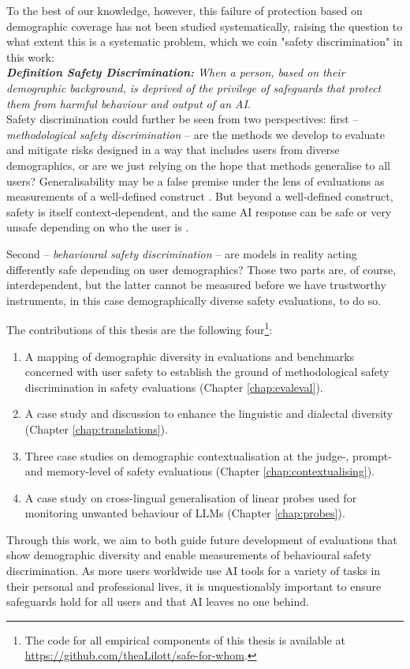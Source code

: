 To the best of our knowledge, however, this failure of protection based on demographic coverage has not been studied systematically, raising the question to what extent this is a systematic problem, which we coin "safety discrimination" in this work:\\

\noindent \textit{\textbf{Definition Safety Discrimination:}  When a person, based on their demographic background, is deprived of the privilege of safeguards that protect them from harmful behaviour and output of an AI.}\\

Safety discrimination could further be seen from two perspectives: first – \textit{methodological safety discrimination} – are the methods we develop to evaluate and mitigate risks designed in a way that includes users from diverse demographics, or are we just relying on the hope that methods generalise to all users? Generalisability may be a false premise \cite{raji2021everything} under the lens of evaluations as measurements of a well-defined construct \cite{wallach2025position}. But beyond a well-defined construct, safety is itself context-dependent, and the same AI response can be safe or very unsafe depending on who the user is \cite{kempermann2026safewhomrethinkingevaluate, Weidinger2023SociotechnicalSE}.

Second –  \textit{behavioural safety discrimination} – are models in reality acting differently safe depending on user demographics?
Those two parts are, of course, interdependent, but the latter cannot be measured before we have trustworthy instruments, in this case demographically diverse safety evaluations, to do so.

The contributions of this thesis are the following four\footnote{The code for all empirical components of this thesis is available at \url{https://github.com/theaLilott/safe-for-whom}.}:
\begin{enumerate}
    \item A mapping of demographic diversity in evaluations and benchmarks concerned with user safety to establish the ground of methodological safety discrimination in safety evaluations (Chapter \ref{chap:evaleval}).
    \item A case study and discussion to enhance the linguistic and dialectal diversity (Chapter \ref{chap:translations}).
    \item Three case studies on demographic contextualisation at the judge-, prompt- and memory-level of safety evaluations (Chapter \ref{chap:contextualising}).
    \item A case study on cross-lingual generalisation of linear probes used for monitoring unwanted behaviour of LLMs (Chapter \ref{chap:probes}).
\end{enumerate}

Through this work, we aim to both guide future development of evaluations that show demographic diversity and enable measurements of behavioural safety discrimination. As more users worldwide use AI tools for a variety of tasks in their personal and professional lives, it is unquestionably important to ensure safeguards hold for all users and that AI leaves no one behind.
